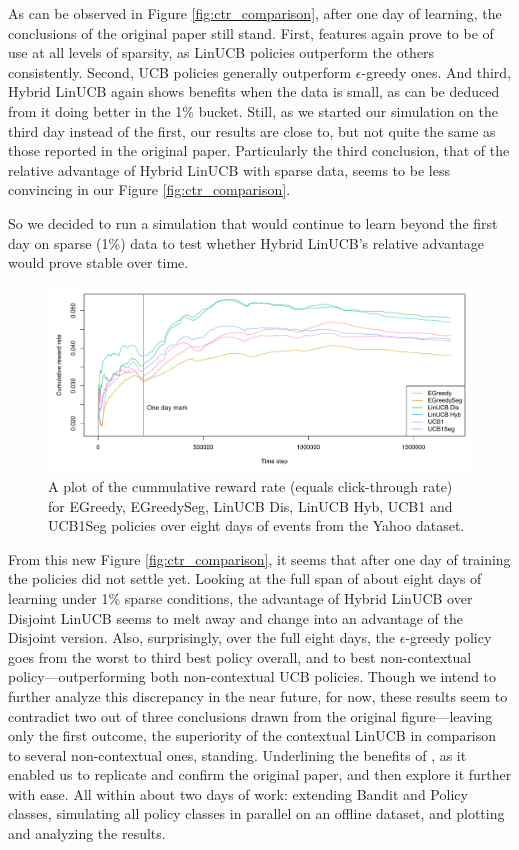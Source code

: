\documentclass{jss}\usepackage[]{graphicx}\usepackage[]{color}
\begin{document}
As can be observed in Figure \ref{fig:ctr_comparison}, after one day of learning, the conclusions of the original paper still stand. First, features again prove to be of use at all levels of sparsity, as LinUCB policies outperform the others consistently. Second, UCB policies generally outperform $\epsilon$-greedy ones. And third, Hybrid LinUCB again shows benefits when the data is small, as can be deduced from it doing better in the 1\% bucket. Still, as we started our simulation on the third day instead of the first, our results are close to, but not quite the same as those reported in the original paper. Particularly the third conclusion, that of the relative advantage of Hybrid LinUCB with sparse data, seems to be less convincing in our Figure \ref{fig:ctr_comparison}.

So we decided to run a simulation that would continue to learn beyond the first day on sparse (1\%) data to test whether Hybrid LinUCB's relative advantage would prove stable over time.

\begin{figure}[H]
  \centering
    \includegraphics[width=.99\textwidth]{fig/one_day}
      \caption{A plot of the cummulative reward rate (equals click-through rate) for EGreedy, EGreedySeg, LinUCB Dis, LinUCB Hyb, UCB1 and UCB1Seg policies over eight days of events from the Yahoo dataset.}
      \label{fig:one_day}
\end{figure}

From this new Figure \ref{fig:ctr_comparison}, it seems that after one day of training the policies did not settle yet. Looking at the full span of about eight days of learning under 1\% sparse conditions, the advantage of Hybrid LinUCB over Disjoint LinUCB seems to melt away and change into an advantage of the Disjoint version. Also, surprisingly, over the full eight days, the $\epsilon$-greedy policy goes from the worst to third best policy overall, and to best non-contextual policy---outperforming both non-contextual UCB policies. Though we intend to further analyze this discrepancy in the near future, for now, these results seem to contradict two out of three conclusions drawn from the original figure---leaving only the first outcome, the superiority of the contextual LinUCB in comparison to several non-contextual ones, standing. Underlining the benefits of , as it enabled us to replicate and confirm the original \cite{Li2010} paper, and then explore it further with ease. All within about two days of work: extending Bandit and Policy classes, simulating all policy classes in parallel on an offline dataset, and plotting and analyzing the results.
\end{document}
